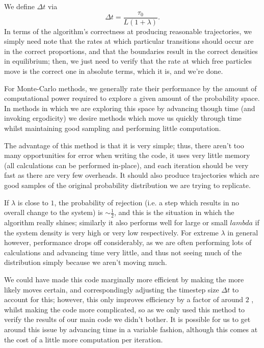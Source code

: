We define $\Delta t$ via 
\begin{equation}
 \Delta t = \frac{\tau_0}{L (1+\lambda)}.
\end{equation}
In terms of the algorithm's correctness at producing reasonable trajectories, we simply need note that
the rates at which particular transitions should occur are in the correct proportions, and that the boundaries result in the correct densities in equilibrium;
then, we just need
to verify that the rate at which free particles move is the correct one in absolute terms, which it is,
and we're done. 

For Monte-Carlo methods, we generally rate their performance by the amount of computational
power required to explore a given amount of the probability space. In methods in which we
are exploring this space by advancing though time (and invoking ergodicity) we desire methods
which move us quickly through time whilst maintaining good sampling and performing little computation.

The advantage of this method is that it is very simple; thus, there aren't too many opportunities
for error when writing the code, it uses very little memory (all calculations can be performed
in-place), and each iteration should be very fast as there are very few overheads. It should also
produce trajectories which are good samples of the original probability distribution we are 
trying to replicate.


If $\lambda$
is close to $1$, the probability of rejection (i.e. a step which results in no overall change to
the system) is $\sim\frac{1}{2}$, and this is the situation in which the algorithm really shines; similarly
it also performs well for large or small $lambda$ if the system density is very high or very low
respectively. For extreme $\lambda$ in general however, performance drops off considerably, as
we are often performing lots of calculations and advancing time very little, and thus not seeing
much of the distribution simply because we aren't moving much.

We could have made this code marginally more efficient by making the more likely moves certain, and
correspondingly adjusting the timestep size $\Delta t$ to account for this; however, this only
improves efficiency by a factor of around $2$ , whilst making the code more complicated, so as
we only used this method to verify the results of our main code we didn't bother.
It is possible for us to get
around this issue by advancing time in a variable fashion, although this comes at the cost of
a little more computation per iteration.

